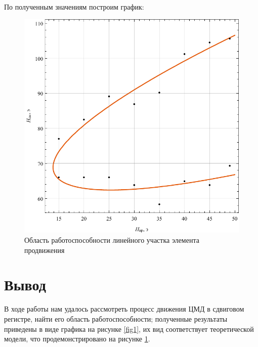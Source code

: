 \documentclass[a4paper, 12pt]{article}
\begin{document}
	По полученным значениям построим график:
	\begin{figure}[!htb]
		\centering
		\includegraphics[scale=1]{plot2.pdf}
		\caption{Область работоспособности линейного участка элемента продвижения}
		\label{fig2}
	\end{figure}
	\section{Вывод}
	В ходе работы нам удалось рассмотреть процесс движения ЦМД в сдвиговом регистре, найти его область работоспособности; полученные результаты приведены в виде графика на рисунке \ref{fig1}, их вид соответствует теоретической модели, что продемонстрировано на рисунке \ref{fig2}.
\end{document}

